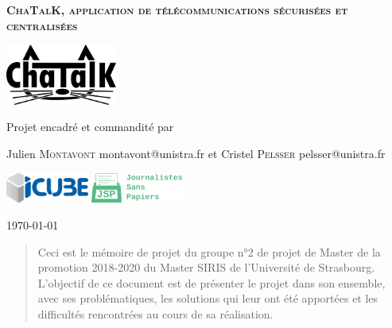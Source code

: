\documentclass{memoire}
\begin{document}
\begin{center}
  \vfill

  {
  \begin{spacing}{1.4}
  \huge
  \textsc {
  \textbf {
      ChaTalK, application de télécommunications sécurisées et centralisées
  }
  }
  \end{spacing}
  }
  \vfill
  \includegraphics[height=2.0cm]{logos/chatalk.png}
  \vfill

  {\large Projet encadré et commandité par}

  \medskip

  {\large Julien \textsc {Montavont}}
  {\small montavont@unistra.fr}
  et
  {\large Cristel \textsc {Pelsser}}
  {\small pelsser@unistra.fr}

  \medskip

  \includegraphics[height=1.0cm]{logos/icube.png}
  \includegraphics[height=1.0cm]{logos/jsp.png}

  {\small \today}
\end{center}

\cleardoublepage


\tableofcontents
{
  \listoffigures
  \listoftables
}

\cleardoublepage

\begin{abstract}
Ceci est le mémoire de projet du groupe n°2 de projet de Master de la promotion 2018-2020 du Master SIRIS de l'Université de Strasbourg.
\newline
L'objectif de ce document est de présenter le projet dans son ensemble, avec ses problématiques, les solutions qui leur ont été apportées et les difficultés rencontrées au cours de sa réalisation.
\end{abstract}
\end{document}
